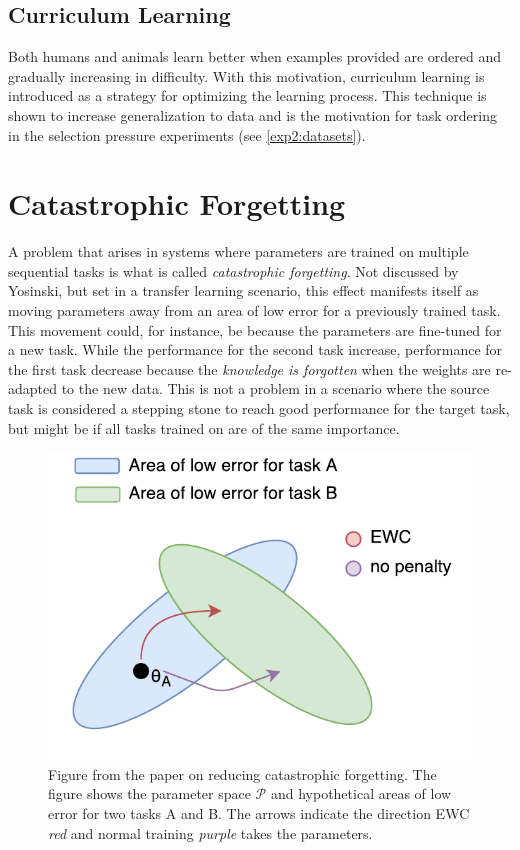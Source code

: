 \subsection{Curriculum Learning}
Both humans and animals learn better when examples provided are ordered and gradually increasing in difficulty. With this motivation, curriculum learning is introduced as a strategy for optimizing the learning process. This technique is shown to increase generalization to data\cite{curriculumlearning} and is the motivation for task ordering in the selection pressure experiments (see \ref{exp2:datasets}).

\section{Catastrophic Forgetting}
\label{background:catastrophicforgetting}
A problem that arises in systems where parameters are trained on multiple sequential tasks is what is called \textit{catastrophic forgetting}. Not discussed by Yosinski, but set in a transfer learning scenario, this effect manifests itself as moving parameters away from an area of low error for a previously trained task. This movement could, for instance, be because the parameters are fine-tuned for a new task. While the performance for the second task increase, performance for the first task decrease because the \textit{knowledge is forgotten} when the weights are re-adapted to the new data. This is not a problem in a scenario where the source task is considered a stepping stone to reach good performance for the target task, but might be if all tasks trained on are of the same importance.

\begin{figure}[ht]
    \centering
    \includegraphics[width=0.7\linewidth]{Chapters/2.Background/figures/EWC.pdf}
    \caption[Elastic Weight Consolidation]{Figure from the paper on reducing catastrophic forgetting\cite{ewc}. The figure shows the parameter space \(\mathcal{P}\) and hypothetical areas of low error for two tasks A and B. The arrows indicate the direction EWC \textit{red} and normal training \textit{purple} takes the parameters.}
    \label{fig:ewc}
\end{figure}

